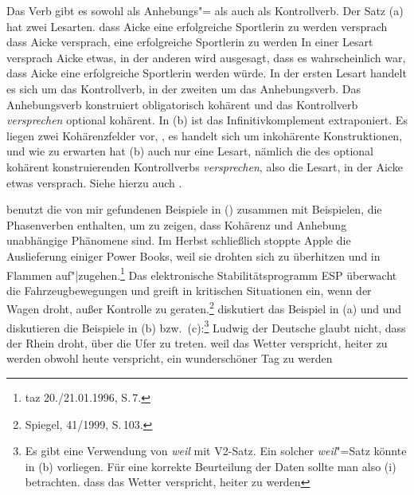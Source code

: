 Das Verb  gibt es sowohl als Anhebungs"= als auch als Kontrollverb. Der Satz
(a) hat zwei Lesarten. 
\eal
\label{bsp-kontrast-raising-extraposition}
\ex
dass Aicke eine erfolgreiche Sportlerin zu werden versprach
\ex\label{ex-versprach-ein-x-zu-werden} 
dass Aicke versprach, eine erfolgreiche Sportlerin zu werden
\zl
In einer Lesart versprach Aicke etwas, in der anderen
wird ausgesagt, dass es wahrscheinlich war, dass Aicke eine erfolgreiche
Sportlerin werden würde. In der ersten Lesart handelt es sich um das Kontrollverb, in der
zweiten um das Anhebungsverb.
Das Anhebungsverb konstruiert obligatorisch kohärent und das Kontrollverb
\emph{versprechen} optional kohärent. In (b) ist das Infinitivkomplement extraponiert.
Es liegen zwei Kohärenzfelder vor, \dash, es handelt sich um inkohärente Konstruktionen, 
und wie zu erwarten hat (b) auch nur eine Lesart, nämlich die des optional kohärent
konstruierenden Kontrollverbs \emph{versprechen}, also die Lesart, in der
Aicke etwas versprach. Siehe hierzu auch .

\citet[]{Meurers2000b} benutzt die von mir gefundenen Beispiele 
in () zusammen mit Beispielen, die Phasenverben enthalten, um zu zeigen,
dass Kohärenz und Anhebung unabhängige Phänomene sind.
\eal{}
\ex 
Im Herbst schließlich stoppte Apple die Auslieferung einiger Power Books, weil sie drohten
     sich zu überhitzen und in Flammen auf"|zugehen.\footnote{
         taz 20./21.01.1996, S.\,7.
    }
\ex
Das elektronische Stabilitätsprogramm ESP überwacht die Fahrzeugbewegungen und greift 
     in kritischen Situationen ein, wenn der Wagen droht, außer Kontrolle zu geraten.\footnote{
        Spiegel, 41/1999, S.\,103.
    }
\zl
\citet[]{Fanselow87a} diskutiert das Beispiel in 
(a) und \citet[]{Rosengren92a} und
\citet[]{Cook2001a} diskutieren die Beispiele in (b) bzw.\ (c):\footnote{
  Es gibt eine Verwendung von \emph{weil} mit V2-Satz. Ein solcher \emph{weil}"=Satz könnte in
  (b) vorliegen. Für eine korrekte Beurteilung der Daten sollte man also
  (i) betrachten.
  \ea
  dass das Wetter verspricht, heiter zu werden
  \zlast
}
\eal
\ex Ludwig der Deutsche glaubt nicht, dass der Rhein droht, über die Ufer zu treten.
\ex weil das Wetter verspricht, heiter zu werden
\ex obwohl heute verspricht, ein wunderschöner Tag zu werden
\zl


